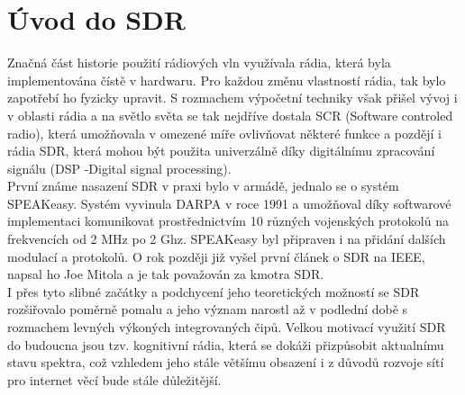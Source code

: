 \documentclass{ctuthesis}
\begin{document}
\section{Úvod do SDR} 
Značná část historie použití rádiových vln využívala rádia, která byla implementována čístě v hardwaru. Pro každou změnu vlastností rádia, tak bylo zapotřebí ho fyzicky upravit. S rozmachem výpočetní techniky však přišel vývoj i v oblasti rádia a na světlo světa se tak nejdříve dostala SCR (Software controled radio), která umožňovala v omezené míře ovlivňovat některé funkce a pozdějí i rádia SDR, která mohou být použita univerzálně díky digitálnímu zpracování signálu (DSP -Digital signal processing). \\
První známe nasazení SDR v praxi bylo v armádě, jednalo se o systém SPEAKeasy. Systém vyvinula DARPA v roce 1991 a umožňoval díky softwarové implementaci komunikovat prostřednictvím 10 různých vojenských protokolů na frekvencích od 2 MHz po 2 Ghz. SPEAKeasy byl připraven i na přidání dalších modulací a protokolů. O rok později již vyšel první článek o SDR na IEEE, napsal ho Joe Mitola a je tak považován za kmotra SDR. \cite{sdrHistory2010}\\
I přes tyto slibné začátky a podchycení jeho teoretických možností se SDR rozšiřovalo poměrně pomalu a jeho význam narostl až v podlední době s rozmachem levných výkoných integrovaných čipů. Velkou motivací využití SDR do budoucna jsou tzv. kognitivní rádia, která se dokáži přizpůsobit aktualnímu stavu spektra, což vzhledem jeho stále většímu obsazení i z důvodů rozvoje sítí pro internet věcí bude stále důležitější.
\end{document}
